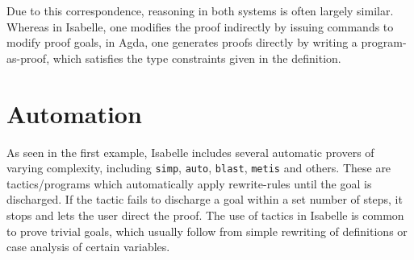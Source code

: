 \documentclass[a4paper, 12pt, twoside]{style/ociamthesis}
\theoremstyle{plain}
\theoremstyle{definition}
\theoremstyle{remark}
\begin{document}
Due to this correspondence, reasoning in both systems is often largely
similar. Whereas in Isabelle, one modifies the proof indirectly by
issuing commands to modify proof goals, in Agda, one generates proofs
directly by writing a program-as-proof, which satisfies the type
constraints given in the definition.

\section{Automation}\label{automation}

As seen in the first example, Isabelle includes several automatic
provers of varying complexity, including \texttt{simp}, \texttt{auto},
\texttt{blast}, \texttt{metis} and others. These are tactics/programs
which automatically apply rewrite-rules until the goal is discharged. If
the tactic fails to discharge a goal within a set number of steps, it
stops and lets the user direct the proof. The use of tactics in Isabelle
is common to prove trivial goals, which usually follow from simple
rewriting of definitions or case analysis of certain variables.
\end{document}
